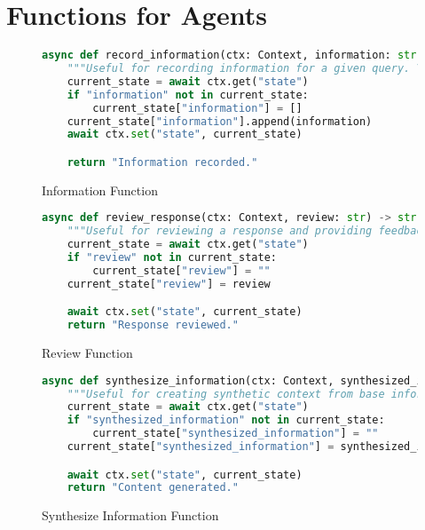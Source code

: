 \chapter{Functions for Agents} \label{AgentFunctions}

\begin{figure}[h]
	\centering
	\small
	\begin{lstlisting}[language=Python, breaklines=true]
async def record_information(ctx: Context, information: str) -> str:
    """Useful for recording information for a given query. Your input should be information written in plain text."""
    current_state = await ctx.get("state")
    if "information" not in current_state:
        current_state["information"] = []
    current_state["information"].append(information)
    await ctx.set("state", current_state)

    return "Information recorded."
    \end{lstlisting}
	\caption{Information Function}
\end{figure}

\begin{figure}[h]
	\centering
	\small
	\begin{lstlisting}[language=Python, breaklines=true]
async def review_response(ctx: Context, review: str) -> str:
    """Useful for reviewing a response and providing feedback. Your input should be a review of the report."""
    current_state = await ctx.get("state")
    if "review" not in current_state:
        current_state["review"] = ""
    current_state["review"] = review

    await ctx.set("state", current_state)
    return "Response reviewed."
    \end{lstlisting}
	\caption{Review Function}
\end{figure}


\begin{figure}[h]
	\centering
	\small
	\begin{lstlisting}[language=Python, breaklines=true]
async def synthesize_information(ctx: Context, synthesized_information: str) -> str:
    """Useful for creating synthetic context from base information provided. Your input should be the synthesized information"""
    current_state = await ctx.get("state")
    if "synthesized_information" not in current_state:
        current_state["synthesized_information"] = ""
    current_state["synthesized_information"] = synthesized_information

    await ctx.set("state", current_state)
    return "Content generated."
    \end{lstlisting}
	\caption{Synthesize Information Function}
\end{figure}

